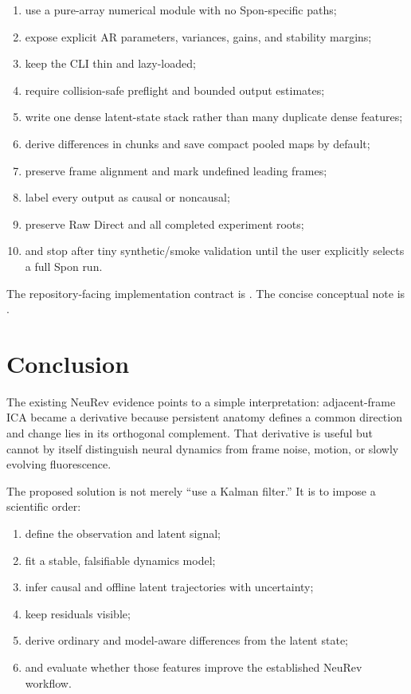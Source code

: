 \documentclass[11pt]{article}
\begin{document}
\begin{enumerate}[leftmargin=*]
\item use a pure-array numerical module with no Spon-specific paths;
\item expose explicit AR parameters, variances, gains, and stability margins;
\item keep the CLI thin and lazy-loaded;
\item require collision-safe preflight and bounded output estimates;
\item write one dense latent-state stack rather than many duplicate dense
  features;
\item derive differences in chunks and save compact pooled maps by default;
\item preserve frame alignment and mark undefined leading frames;
\item label every output as causal or noncausal;
\item preserve Raw Direct and all completed experiment roots;
\item and stop after tiny synthetic/smoke validation until the user explicitly
  selects a full Spon run.
\end{enumerate}

The repository-facing implementation contract is
.
The concise conceptual note is
.

\section{Conclusion}

The existing NeuRev evidence points to a simple interpretation: adjacent-frame
ICA became a derivative because persistent anatomy defines a common direction
and change lies in its orthogonal complement. That derivative is useful but
cannot by itself distinguish neural dynamics from frame noise, motion, or
slowly evolving fluorescence.

The proposed solution is not merely ``use a Kalman filter.'' It is to impose a
scientific order:

\begin{enumerate}[leftmargin=*]
\item define the observation and latent signal;
\item fit a stable, falsifiable dynamics model;
\item infer causal and offline latent trajectories with uncertainty;
\item keep residuals visible;
\item derive ordinary and model-aware differences from the latent state;
\item and evaluate whether those features improve the established NeuRev
  workflow.
\end{enumerate}
\end{document}
